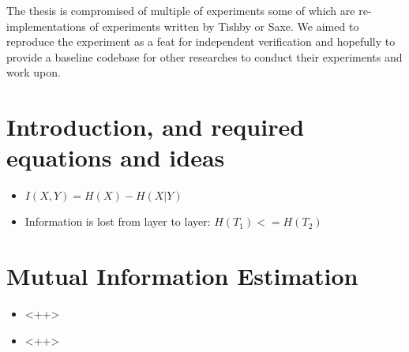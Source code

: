 
The thesis is compromised of multiple of experiments some of which are
re-implementations of experiments written by Tishby or Saxe. We aimed to
reproduce the experiment as a feat for independent verification and hopefully to
provide a baseline codebase for other researches to conduct their experiments
and work upon.


\section{Introduction, and required equations and ideas}

\begin{itemize}
  \item{
      $ I(X, Y) = H(X) - H(X|Y) $
    }
  \item{
      Information is lost from layer to layer:
      $ H(T_1) <= H(T_2) $
    }
\end{itemize}


\section{Mutual Information Estimation}

\begin{itemize}
  \item{
      <++>
    }
  \item{
      <++>
    }
\end{itemize}

